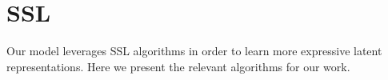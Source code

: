 \documentclass[../../thesis.tex]{subfiles}
\begin{document}
\section{SSL}

Our model leverages SSL algorithms in order to learn more expressive latent representations. Here we present the relevant algorithms for our work. 


\end{document}
